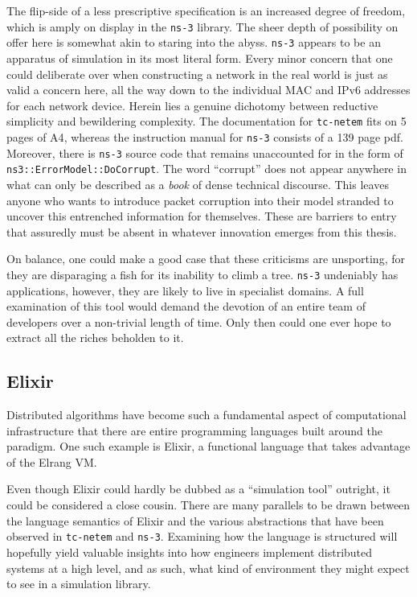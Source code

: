 The flip-side of a less prescriptive specification is an increased degree of freedom, which is amply on display in
the \texttt{ns-3} library. The sheer depth of possibility on offer here is somewhat akin to staring into the abyss.
\texttt{ns-3} appears to be an apparatus of simulation in its most literal form. Every minor concern that one could
deliberate over when constructing a network in the real world is just as valid a concern here, all the way down to
the individual MAC and IPv6 addresses for each network device. Herein lies a genuine dichotomy between reductive
simplicity and bewildering complexity. The documentation for \texttt{tc-netem} fits on 5 pages of
A4\cite{tc_netem_8_man}, whereas the instruction manual for \texttt{ns-3} consists of a 139 page pdf\cite{ns_3_man_pdf}.
Moreover, there is \texttt{ns-3} source code that remains unaccounted for in the form of
\texttt{ns3::ErrorModel::DoCorrupt}. The word ``corrupt'' does not appear anywhere in what can only be described as
a \emph{book} of dense technical discourse. This leaves anyone who wants to introduce packet corruption into their
model stranded to uncover this entrenched information for themselves. These are barriers to entry that assuredly must
be absent in whatever innovation emerges from this thesis.

On balance, one could make a good case that these criticisms are unsporting, for they are disparaging a fish for its
inability to climb a tree\cite{einstein_quotes}. \texttt{ns-3} undeniably has applications, however, they are likely
to live in specialist domains. A full examination of this tool would demand the devotion of an entire team of
developers over a non-trivial length of time. Only then could one ever hope to extract all the riches beholden to it.

\subsection{Elixir}

Distributed algorithms have become such a fundamental aspect of computational infrastructure that there are entire
programming languages built around the paradigm. One such example is Elixir, a functional language that takes advantage
of the Elrang VM\cite{elixir, erlang}.

Even though Elixir could hardly be dubbed as a ``simulation tool'' outright, it could be considered a close cousin.
There are many parallels to be drawn between the language semantics of Elixir and the various abstractions that
have been observed in \texttt{tc-netem} and \texttt{ns-3}. Examining how the language is structured will hopefully
yield valuable insights into how engineers implement distributed systems at a high level, and as such, what kind of
environment they might expect to see in a simulation library.

